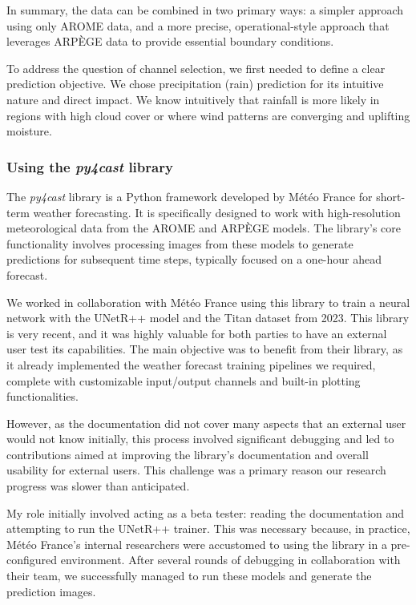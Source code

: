 In summary, the data can be combined in two primary ways: a simpler approach using only AROME data, and a more precise, operational-style approach that leverages ARPÈGE data to provide essential boundary conditions.

To address the question of channel selection, we first needed to define a clear prediction objective. We chose precipitation (rain) prediction for its intuitive nature and direct impact. We know intuitively that rainfall is more likely in regions with high cloud cover or where wind patterns are converging and uplifting moisture.

\subsubsection{Using the \textit{py4cast} library}
The \textit{py4cast} library \cite{py4cast} is a Python framework developed by Météo France for short-term weather forecasting. It is specifically designed to work with high-resolution meteorological data from the AROME and ARPÈGE models. The library's core functionality involves processing images from these models to generate predictions for subsequent time steps, typically focused on a one-hour ahead forecast.

We worked in collaboration with Météo France using this library to train a neural network with the UNetR++ model \cite{unetrpp} and the Titan dataset \cite{titandataset} from 2023. This library is very recent, and it was highly valuable for both parties to have an external user test its capabilities. The main objective was to benefit from their library, as it already implemented the weather forecast training pipelines we required, complete with customizable input/output channels and built-in plotting functionalities.

However, as the documentation did not cover many aspects that an external user would not know initially, this process involved significant debugging and led to contributions aimed at improving the library's documentation and overall usability for external users. This challenge was a primary reason our research progress was slower than anticipated.

My role initially involved acting as a beta tester: reading the documentation and attempting to run the UNetR++ trainer. This was necessary because, in practice, Météo France's internal researchers were accustomed to using the library in a pre-configured environment. After several rounds of debugging in collaboration with their team, we successfully managed to run these models and generate the prediction images.


